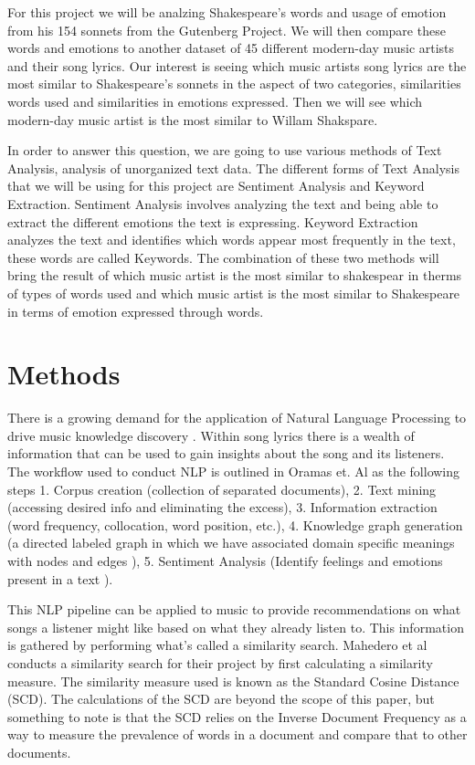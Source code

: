 \documentclass[11pt]{article}
\begin{document}
\noindent For this project we will be analzing Shakespeare's words and usage of emotion from his 154 sonnets from the Gutenberg Project\cite{sonnetsData}. We will then compare these words and emotions to another dataset of 45 different modern-day music artists and their song lyrics\cite{musicData}. Our interest is seeing which music artists song lyrics are the most similar to Shakespeare's sonnets in the aspect of two categories, similarities words used and similarities in emotions expressed. Then we will see which modern-day music artist is the most similar to Willam Shakspare.  

\noindent In order to answer this question, we are going to use various methods of Text Analysis, analysis of unorganized text data\cite{monkey}. The different forms of Text Analysis that we will be using for this project are Sentiment Analysis and Keyword Extraction. Sentiment Analysis involves analyzing the text and being able to extract the different emotions the text is expressing\cite{monkey}. Keyword Extraction analyzes the text and identifies which words appear most frequently in the text, these words are called Keywords\cite{monkey}. The combination of these two methods will bring the result of which music artist is the most similar to shakespear in therms of types of words used and which music artist is the most similar to Shakespeare in terms of emotion expressed through words.  

\section{Methods}
There is a growing demand for the application of Natural Language Processing to drive music knowledge discovery \cite{NLP-for-lyrics}. Within song lyrics there is a wealth of information that can be used to gain insights about the song and its listeners. The workflow used to conduct NLP is outlined in Oramas et. Al \cite{NLP-for-music} as the following steps 1. Corpus creation (collection of separated documents), 2. Text mining (accessing desired info and eliminating the excess), 3. Information extraction (word frequency, collocation, word position, etc.), 4. Knowledge graph generation (a directed labeled graph in which we have associated domain specific meanings with nodes and edges \cite{knowledge-graphs}), 5. Sentiment Analysis (Identify feelings and emotions present in a text \cite{monkey}).
 
\noindent This NLP pipeline can be applied to music to provide recommendations on what songs a listener might like based on what they already listen to. \cite{NLP-for-lyrics} This information is gathered by performing what’s called a similarity search. Mahedero et al \cite{NLP-for-lyrics} conducts a similarity search for their project by first calculating a similarity measure. The similarity measure used is known as the Standard Cosine Distance (SCD). The calculations of the SCD are beyond the scope of this paper, but something to note is that the SCD relies on the Inverse Document Frequency as a way to measure the prevalence of words in a document and compare that to other documents. 
\end{document}
